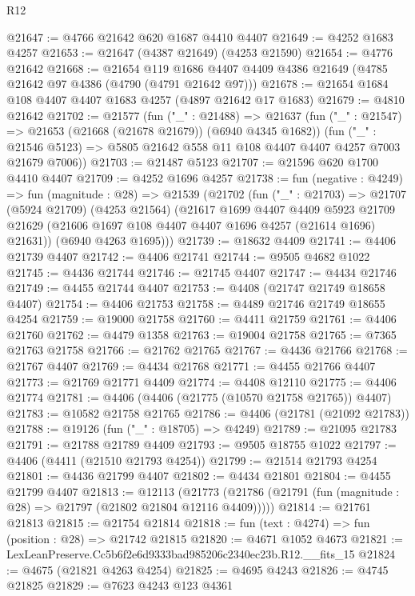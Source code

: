 \begin{lexlean}{R12}
\begin{coremodule}
@21647 := @4766 @21642 @620 @1687 @4410 @4407
@21649 := @4252 @1683 @4257
@21653 := @21647 (@4387 @21649) (@4253 @21590)
@21654 := @4776 @21642
@21668 := @21654
    @119
    @1686
    @4407
    @4409
    @4386
    @21649
    (@4785 @21642 @97 @4386 (@4790 (@4791 @21642 @97)))
@21678 := @21654 @1684 @108 @4407 @4407 @1683 @4257 (@4897 @21642 @17 @1683)
@21679 := @4810 @21642
@21702 := @21577
    (fun ("_" : @21488) =>
    @21637
      (fun ("_" : @21547) => @21653 (@21668 (@21678 @21679)) (@6940 @4345 @1682))
      (fun ("_" : @21546 @5123) => @5805 @21642 @558 @11 @108 @4407 @4407 @4257 @7003 @21679 @7006))
@21703 := @21487 @5123
@21707 := @21596 @620 @1700 @4410 @4407
@21709 := @4252 @1696 @4257
@21738 := fun (negative : @4249) =>
  fun (magnitude : @28) =>
  @21539
    (@21702
      (fun ("_" : @21703) =>
      @21707
        (@5924 @21709)
        (@4253 @21564)
        (@21617
          @1699
          @4407
          @4409
          @5923
          @21709
          @21629
          (@21606 @1697 @108 @4407 @4407 @1696 @4257 (@21614 @1696) @21631))
        (@6940 @4263 @1695)))
@21739 := @18632 @4409
@21741 := @4406 @21739 @4407
@21742 := @4406 @21741
@21744 := @9505 @4682 @1022
@21745 := @4436 @21744
@21746 := @21745 @4407
@21747 := @4434 @21746
@21749 := @4455 @21744 @4407
@21753 := @4408 (@21747 @21749 @18658 @4407)
@21754 := @4406 @21753
@21758 := @4489 @21746 @21749 @18655 @4254
@21759 := @19000 @21758
@21760 := @4411 @21759
@21761 := @4406 @21760
@21762 := @4479 @1358
@21763 := @19004 @21758
@21765 := @7365 @21763 @21758
@21766 := @21762 @21765
@21767 := @4436 @21766
@21768 := @21767 @4407
@21769 := @4434 @21768
@21771 := @4455 @21766 @4407
@21773 := @21769 @21771 @4409
@21774 := @4408 @12110
@21775 := @4406 @21774
@21781 := @4406 (@4406 (@21775 (@10570 @21758 @21765)) @4407)
@21783 := @10582 @21758 @21765
@21786 := @4406 (@21781 (@21092 @21783))
@21788 := @19126 (fun ("_" : @18705) => @4249)
@21789 := @21095 @21783
@21791 := @21788 @21789 @4409
@21793 := @9505 @18755 @1022
@21797 := @4406 (@4411 (@21510 @21793 @4254))
@21799 := @21514 @21793 @4254
@21801 := @4436 @21799 @4407
@21802 := @4434 @21801
@21804 := @4455 @21799 @4407
@21813 := @12113
    (@21773 (@21786 (@21791 (fun (magnitude : @28) => @21797 (@21802 @21804 @12116 @4409)))))
@21814 := @21761 @21813
@21815 := @21754 @21814
@21818 := fun (text : @4274) => fun (position : @28) => @21742 @21815
@21820 := @4671 @1052 @4673
@21821 := LexLeanPreserve.Cc5b6f2e6d9333bad985206c2340ec23b.R12.__fits_15
@21824 := @4675 (@21821 @4263 @4254)
@21825 := @4695 @4243
@21826 := @4745 @21825
@21829 := @7623 @4243 @123 @4361

\end{coremodule}
\end{lexlean}
